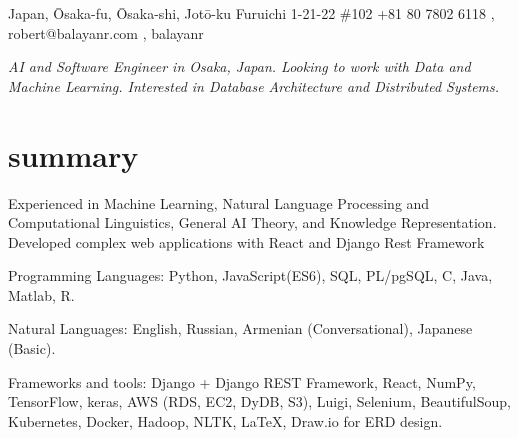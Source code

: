 \documentclass[]{cv-roald}
\begin{document}
\pagestyle{empty} %

{\faMapMarker \hspace{\FAspace} Japan, Ōsaka-fu, Ōsaka-shi, Jotō-ku Furuichi 1-21-22 \#102}
{\faMobile \hspace{\FAspace} +81 80 7802 6118 \sep 
\href{mailto:robert@balayanr.com}{\faEnvelope} \hspace{\FAspace} \faSkype\hspace{\FAspace} robert@balayanr.com \sep 
\href{https://www.linkedin.com/in/balayanr/}{\faLinkedinSquare} \hspace{\FAspace} \href{https://github.com/balayanr}{\faGithub} \hspace{\FAspace} \href{https://www.facebook.com/balayanr}{\faFacebookSquare} \hspace{\FAspace}\href{https://vk.com/yahhh_gf}{\faVk} \hspace{\FAspace} balayanr \FAspace  %
}
\hypersetup{
    urlcolor=darkermain
}


\textit{AI and Software Engineer in Osaka, Japan. Looking to work with Data and Machine Learning. Interested in Database Architecture and Distributed Systems.}

\section*{summary}
\begin{tabitemize}
    \item Experienced in Machine Learning, Natural Language Processing and Computational Linguistics, General AI Theory, and Knowledge Representation. Developed complex web applications with React and Django Rest Framework
    \item Programming Languages: Python, JavaScript(ES6), SQL, PL/pgSQL, C, Java, Matlab, R.
    \item Natural Languages: English, Russian, Armenian (Conversational), Japanese (Basic).
    \item Frameworks and tools: Django + Django REST Framework, React, NumPy, TensorFlow, keras, AWS (RDS, EC2, DyDB, S3), Luigi, Selenium, BeautifulSoup, Kubernetes, Docker, Hadoop, NLTK, \LaTeX, Draw.io for ERD design.
\end{tabitemize}
\end{document}
